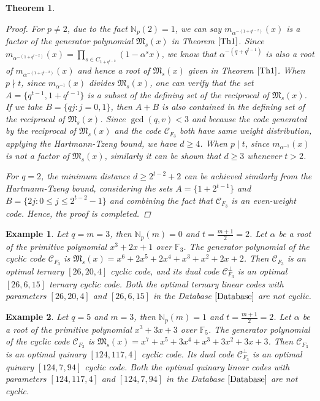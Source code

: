 \documentclass[pdflatex,sn-mathphys-num]{sn-jnl}%
\theoremstyle{thmstyleone}%
\newtheorem{theorem}{Theorem}%
\theoremstyle{thmstyletwo}%
\newtheorem{example}{Example}%
\theoremstyle{thmstylethree}%
\begin{document}
\begin{theorem}
\begin{proof}
      \par  For $p\neq 2$, due to the fact $\mathbb{N}_{p}(2)=1$, we can say $m_{\alpha^{-(1+q^{t-2})}}(x)$ is a factor of the generator polynomial $\mathfrak{M}_{s}(x)$ in Theorem $\ref{Th1}$. Since $m_{\alpha^{-(1+q^{t-2})}}(x)=\prod_{s\in C_{1+q^{t-2}}}(1-\alpha^{s}x)$, we know that $\alpha^{-(q+q^{t-1})}$ is also a root of $m_{\alpha^{-(1+q^{t-2})}}(x)$ and hence a root of $\mathfrak{M}_{s}(x)$ given in Theorem $\ref{Th1}$. When $p\nmid t$, since $m_{\alpha^{-1}}(x)$ divides $\mathfrak{M}_{s}(x)$, one can verify that the set $A=\{q^{t-1},1+q^{t-1}\}$ is a subset of the defining set of the reciprocal of $\mathfrak{M}_{s}(x)$. If we take $B=\{qj:j=0,1\}$, then $A+B$ is also contained in the defining set of the reciprocal of $\mathfrak{M}_{s}(x)$. Since $\operatorname{gcd}(q,v)<3$ and because the code generated by the reciprocal of $\mathfrak{M}_{s}(x)$ and the code $\mathcal{C}_{F_{3}}$ both have same weight distribution, applying the Hartmann-Tzeng bound, we have $d\geq 4$. When $p\mid t$, since $m_{\alpha^{-1}}(x)$ is not a factor of $\mathfrak{M}_{s}(x)$, similarly it can be shown that $d\geq 3$ whenever $t>2$.
        
        \par For $q=2$, the minimum distance $d\geq 2^{t-2}+2$ can be achieved similarly from the Hartmann-Tzeng bound, considering the sets $A=\{1+2^{t-1}\}$ and $B=\{2j:0\leq j\leq 2^{t-2}-1\}$ and combining the fact that $\mathcal{C}_{F_{3}}$ is an even-weight code.
        \vskip 1pt
        Hence, the proof is completed.
    \end{proof}
\end{theorem}
\begin{example}
    Let $q=m=3$, then $\mathbb{N}_{p}(m)=0$ and $t=\frac{m+1}{2}=2$. Let $\alpha$ be a root of the primitive polynomial $x^3 + 2x + 1$ over $\mathbb{F}_{3}$. The generator polynomial of the cyclic code $\mathcal{C}_{F_{3}}$ is $\mathfrak{M}_{s}(x)=x^6 + 2x^5 + 2x^4 + x^3 + x^2 + 2x + 2$. Then $\mathcal{C}_{F_{3}}$ is an optimal ternary $[26, 20, 4]$ cyclic code, and its dual code $\mathcal{C}_{F_{3}}^{\perp}$ is an optimal $[26, 6, 15]$ ternary cyclic code. Both the optimal ternary linear codes with parameters $[26, 20, 4]$ and $[26, 6, 15]$ in the Database $\textnormal{\cite{Database}}$ are not cyclic.  
\end{example}
\vspace{1em}
\begin{example}
    Let $q=5$ and $m=3$, then $\mathbb{N}_{p}(m)=1$ and $t=\frac{m+1}{2}=2$. Let $\alpha$ be a root of the primitive polynomial $x^3 + 3x + 3$ over $\mathbb{F}_{5}$. The generator polynomial of the cyclic code $\mathcal{C}_{F_{3}}$ is $\mathfrak{M}_{s}(x)=x^7 + x^5 +  3x^4 + x^3 + 3x^2 + 3x + 3$. Then $\mathcal{C}_{F_{3}}$ is an optimal quinary $[124, 117, 4]$ cyclic code. Its dual code $\mathcal{C}_{F_{3}}^{\perp}$ is an optimal quinary $[124,7,94]$ cyclic code. Both the optimal quinary linear codes with parameters $[124, 117, 4]$ and $[124,7,94]$ in the Database $\textnormal{\cite{Database}}$ are not cyclic. %
\end{example}
\end{document}

